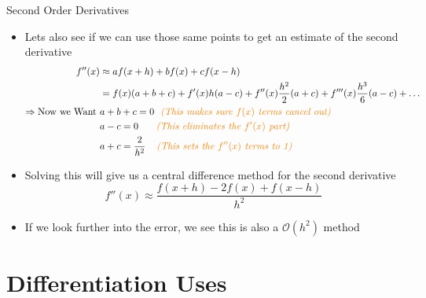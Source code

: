 {}\documentclass[letterpaper,
compress,
xcolor=x11names,
]{beamer}
\begin{document}
\begin{frame}{Second Order Derivatives}
	\footnotesize
	\begin{itemize}
		\item Lets also see if we can use those same points to get an estimate of the second derivative
		\tiny
		\begin{align*}
			f''(x) & \approx af(x+h) + bf(x) + cf(x-h) \\
			&= f(x)(a+b+c) + f'(x)h(a-c) + f''(x)\frac{h^2}{2}(a+c) + f'''(x)\frac{h^3}{6}(a-c) + \dots \\
			\Rightarrow \text{Now we Want } & a+b+c = 0 \hspace{0.225cm}\text{\textit{\textcolor{orange}{(This makes sure $f(x)$ terms cancel out)}}}\\
			& a-c = 0 \hspace{0.65cm}\text{\textit{\textcolor{orange}{(This eliminates the $f'(x)$ part)}}}\\
			& a+c = \frac{2}{h^2} \hspace{0.4cm}\text{\textit{\textcolor{orange}{(This sets the $f''(x)$ terms to 1)}}}
		\end{align*}
		\footnotesize
		\item Solving this will give us a central difference method for the second derivative
		\begin{equation*}
			f''(x) \approx \frac{f(x+h) - 2f(x) + f(x-h)}{h^2}
		\end{equation*}
		\item If we look further into the error, we see this is also a $\mathcal{O}(h^2)$ method
	\end{itemize}
\end{frame}

\section{Differentiation Uses}
\end{document}
